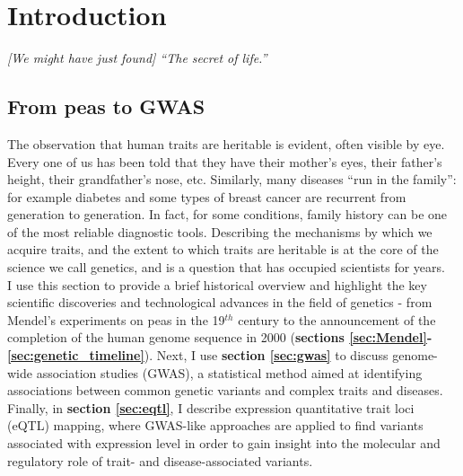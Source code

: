 
\chapter{Introduction}  %
\label{chapter1}

\textit{[We might have just found] “The secret of life.”}\\

\section{From peas to GWAS}  %

The observation that human traits are heritable is evident, often visible by eye. 
Every one of us has been told that they have their mother’s eyes, their father’s height, their grandfather’s nose, etc. 
Similarly, many diseases “run in the family”: for example diabetes and some types of breast cancer are recurrent from generation to generation. 
In fact, for some conditions, family history can be one of the most reliable diagnostic tools. 
Describing the mechanisms by which we acquire traits, and the extent to which traits are heritable is at the core of the science we call genetics, and is a question that has occupied scientists for years.\\

I use this section to provide a brief historical overview and highlight the key scientific discoveries and technological advances in the field of genetics - from Mendel's experiments on peas in the 19$^{th}$ century to the announcement of the completion of the human genome sequence in 2000 (\textbf{sections \ref{sec:Mendel}-\ref{sec:genetic_timeline}}).
Next, I use \textbf{section \ref{sec:gwas}} to discuss genome-wide association studies (GWAS), a statistical method aimed at identifying associations between common genetic variants and complex traits and diseases.
Finally, in \textbf{section \ref{sec:eqtl}}, I describe expression quantitative trait loci (eQTL) mapping, where GWAS-like approaches are applied to find variants associated with expression level in order to gain insight into the molecular and regulatory role of trait- and disease-associated variants.

